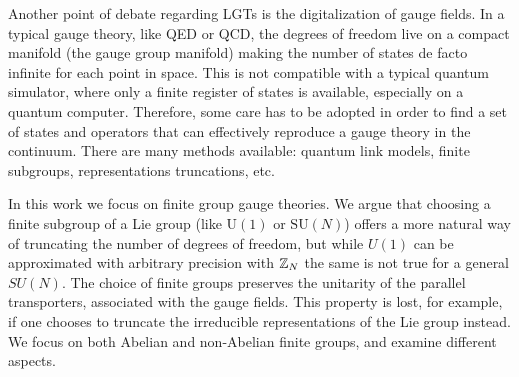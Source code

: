 Another point of debate regarding LGTs is the digitalization of gauge fields.
In a typical gauge theory, like QED or QCD, the degrees of freedom live on a compact manifold (the gauge group manifold) making the number of states de facto infinite for each point in space.
This is not compatible with a typical quantum simulator, where only a finite register of states is available, especially on a quantum computer.
Therefore, some care has to be adopted in order to find a set of states and operators that can effectively reproduce a gauge theory in the continuum.
There are many methods available: quantum link models, finite subgroups, representations truncations, etc.

\bigskip

In this work we focus on finite group gauge theories.
We argue that choosing a finite subgroup of a Lie group (like $\mathrm{U}(1)$ or $\mathrm{SU}(N)$) offers a more natural way of truncating the number of degrees of freedom, but while $U(1)$ can be approximated with arbitrary precision with $\mathbb{Z}_N$ the same is not true for a general $SU(N)$.
The choice of finite groups preserves the unitarity of the parallel transporters, associated with the gauge fields.
This property is lost, for example, if one chooses to truncate the irreducible representations of the Lie group instead.
We focus on both Abelian \cite{pradhan2022ladder} and non-Abelian \cite{pradhan_unpublished} finite groups, and examine different aspects.

\bigskip

